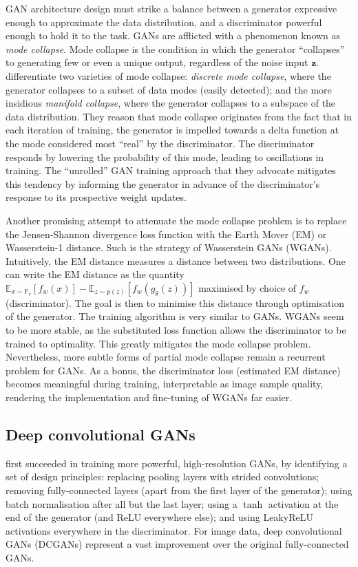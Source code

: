 GAN architecture design must strike a balance between a generator expressive enough to approximate the data distribution, and a discriminator powerful enough to hold it to the task. GANs are afflicted with a phenomenon known as \emph{mode collapse}. Mode collapse is the condition in which the generator ``collapses'' to generating few or even a unique output, regardless of the noise input $\mathbf{z}$. \cite{metz2016unrolled} differentiate two varieties of mode collapse: \emph{discrete mode collapse}, where the generator collapses to a subset of data modes (easily detected); and the more insidious \emph{manifold collapse}, where the generator collapses to a subspace of the data distribution. They reason that mode collapse originates from the fact that in each iteration of training, the generator is impelled towards a delta function at the mode considered most ``real'' by the discriminator. The discriminator responds by lowering the probability of this mode, leading to oscillations in training. The ``unrolled'' GAN training approach that they advocate mitigates this tendency by informing the generator in advance of the discriminator's response to its prospective weight updates.

Another promising attempt to attenuate the mode collapse problem is to replace the Jensen-Shannon divergence loss function with the Earth Mover (EM) or Wasserstein-1 distance. Such is the strategy of Wasserstein GANs (WGANs). Intuitively, the EM distance measures a distance between two distributions. One can write the EM distance as the quantity $\mathbb{E}_{x \sim \mathbb{P}_r}[f_w(x)] - \mathbb{E}_{z\sim p(z)}[f_w(g_{\theta}(z))]$ maximised by choice of $f_w$ (discriminator). The goal is then to minimise this distance through optimisation of the generator. The training algorithm is very similar to GANs. WGANs seem to be more stable, as the substituted loss function allows the discriminator to be trained to optimality. This greatly mitigates the mode collapse problem. Nevertheless, more subtle forms of partial mode collapse remain a recurrent problem for GANs. As a bonus, the discriminator loss (estimated EM distance) becomes meaningful during training, interpretable as image sample quality, rendering the implementation and fine-tuning of WGANs far easier.

\subsection{Deep convolutional GANs}
\label{subsec:dcgan_definition}
\cite{radford2015unsupervised} first succeeded in training more powerful, high-resolution GANs, by identifying a set of design principles: replacing pooling layers with strided convolutions; removing fully-connected layers (apart from the first layer of the generator); using batch normalisation after all but the last layer; using a $\tanh$ activation at the end of the generator (and ReLU everywhere else); and using LeakyReLU activations everywhere in the discriminator. For image data, deep convolutional GANs (DCGANs) represent a vast improvement over the original fully-connected GANs.

